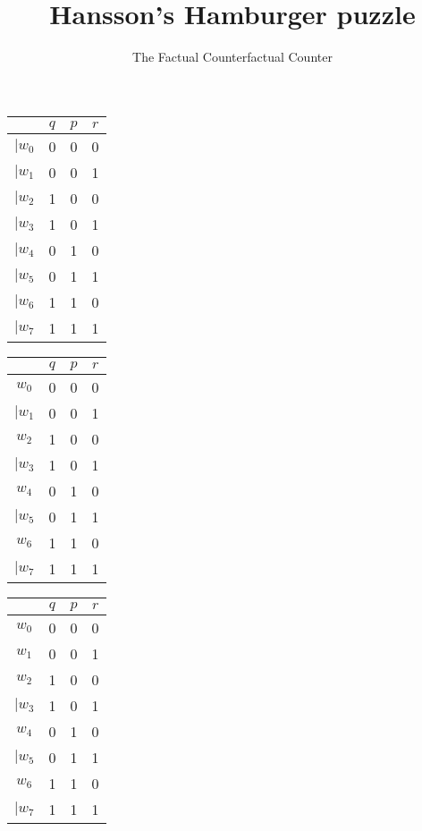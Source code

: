 \documentclass[a4paper,12pt,parskip=half]{scrartcl}
\title{Hansson's Hamburger puzzle}
\author{The Factual Counterfactual Counter}
\begin{document}
    \maketitle
\begin{tabular}{|c|ccc|}
    \hline 
              & $q$ & $p$ & $r$ \\ 
    \hline 
      $|w_0$  &  0  &  0  &  0  \\ 
      $|w_1$  &  0  &  0  &  1  \\ 
      $|w_2$  &  1  &  0  &  0  \\ 
      $|w_3$  &  1  &  0  &  1  \\ 
      $|w_4$  &  0  &  1  &  0  \\ 
      $|w_5$  &  0  &  1  &  1  \\ 
      $|w_6$  &  1  &  1  &  0  \\ 
      $|w_7$  &  1  &  1  &  1  \\ 
    \hline
    \end{tabular}\begin{tabular}{|c|ccc|}
    \hline 
              & $q$ & $p$ & $r$ \\ 
    \hline 
       $w_0$  &  0  &  0  &  0  \\ 
      $|w_1$  &  0  &  0  &  1  \\ 
       $w_2$  &  1  &  0  &  0  \\ 
      $|w_3$  &  1  &  0  &  1  \\ 
       $w_4$  &  0  &  1  &  0  \\ 
      $|w_5$  &  0  &  1  &  1  \\ 
       $w_6$  &  1  &  1  &  0  \\ 
      $|w_7$  &  1  &  1  &  1  \\ 
    \hline
    \end{tabular}\begin{tabular}{|c|ccc|}
    \hline 
              & $q$ & $p$ & $r$ \\ 
    \hline 
       $w_0$  &  0  &  0  &  0  \\ 
\sout{$w_1$}  &  0  &  0  &  1  \\ 
       $w_2$  &  1  &  0  &  0  \\ 
      $|w_3$  &  1  &  0  &  1  \\ 
       $w_4$  &  0  &  1  &  0  \\ 
      $|w_5$  &  0  &  1  &  1  \\ 
       $w_6$  &  1  &  1  &  0  \\ 
      $|w_7$  &  1  &  1  &  1  \\ 

\end{tabular}
\end{document}
